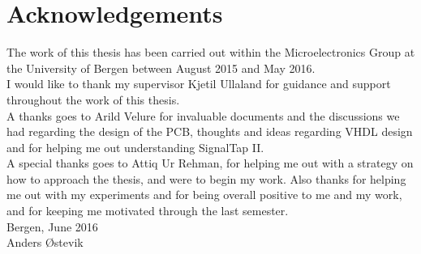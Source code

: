 \documentclass[main.tex]{subfiles}
\begin{document}
\chapter*{Acknowledgements}



{\setlength{\parindent}{0cm}
The work of this thesis has been carried out within the Microelectronics Group at the University of Bergen between August 2015 and May 2016.\\

I would like to thank my supervisor Kjetil Ullaland for guidance and support throughout the work of this thesis. \\

A thanks goes to Arild Velure for invaluable documents and the discussions we had regarding the design of the PCB, thoughts and ideas regarding VHDL design and for helping me out understanding SignalTap II.\\

A special thanks goes to Attiq Ur Rehman, for helping me out with a strategy on how to approach the thesis, and were to begin my work. Also thanks for helping me out with my experiments and for being overall positive to me and my work, and for keeping me motivated through the last semester.\\




Bergen, June 2016 \\[1em]


Anders Østevik

}

\end{document}
